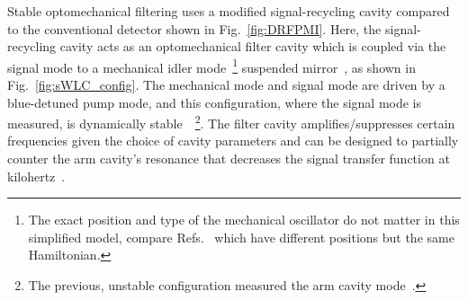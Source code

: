 Stable optomechanical filtering uses a modified signal-recycling cavity compared to the conventional detector shown in Fig.~\ref{fig:DRFPMI}. Here, the signal-recycling cavity acts as an optomechanical filter cavity which is coupled via the signal mode to a mechanical idler mode~\footnote{The exact position and type of the mechanical oscillator do not matter in this simplified model, compare Refs.~\cite{liBroadbandSensitivityImprovement2020,liEnhancingInterferometerSensitivity2021} which have different positions but the same Hamiltonian.} suspended mirror~\cite{}, as shown in Fig.~\ref{fig:sWLC_config}. The mechanical mode and signal mode are driven by a blue-detuned pump mode, and this configuration, where the signal mode is measured, is dynamically stable~\cite{}~\footnote{The previous, unstable configuration measured the arm cavity mode~\cite{miaoEnhancingBandwidthGravitationalWave2015}.}.
The filter cavity amplifies/suppresses certain frequencies given the choice of cavity parameters and can be designed to partially counter the arm cavity's resonance that decreases the signal transfer function at kilohertz~\cite{}. %
